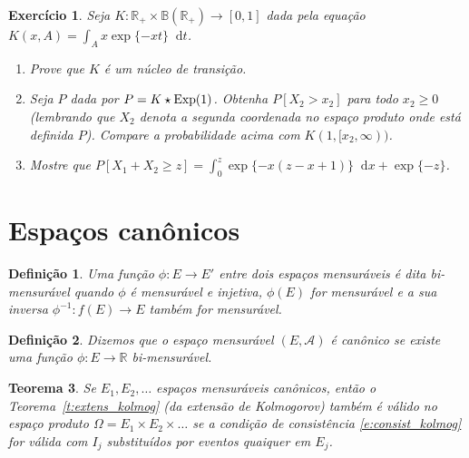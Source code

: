 \documentclass[reqno, draft]{book}
\newcommand*\1{\mathds{1}}
\newtheorem{theorem}{Teorema}[section]
\newtheorem{definition}[theorem]{Definição}
\newtheorem{exercise}[example]{Exercício}
\renewcommand*\d{\mathop{}\!\mathrm{d}}
\begin{document}
\begin{exercise}
  Seja $K:\mathbb{R}_+ \times \mathbb{B}(\mathbb{R}_+) \to [0,1]$ dada pela equação $K(x,A) = \int_A x \exp\{-x t\} \d t$.
  \begin{enumerate}[\quad a)]
  \item Prove que $K$ \'e um n\'ucleo de transi\c{c}\~ao.
  \item Seja $P$ dada por $P = K \star \textnormal{Exp}(1)$.
    Obtenha $P[X_2 > x_2]$ para todo $x_2 \geq 0$ (lembrando que $X_2$ denota a segunda coordenada no espa\c{c}o produto onde est\'a definida $P$).
    Compare a probabilidade acima com $K(1,[x_2, \infty))$.
  \item Mostre que $P[X_1 + X_2 \geq z] = \int_0^z \exp \{-x(z-x+1)\} \d x + \exp\{-z\}$.
  \end{enumerate}
\end{exercise}

\section{Espaços canônicos}

\begin{definition}
  Uma função $\phi:E \to E'$ entre dois espaços mensuráveis é dita bi-mensurável  quando $\phi$ é mensurável e injetiva, $\phi(E)$ for mensurável e a sua inversa $\phi^{-1}:f(E) \to E$ também for mensurável.
\end{definition}


\begin{definition}
  Dizemos que o espaço mensurável $(E, \mathcal{A})$ é canônico  se existe uma função $\phi: E \to \mathbb{R}$ bi-mensurável.
\end{definition}

\begin{theorem}
  Se $E_1, E_2, \dots$ espaços mensuráveis canônicos, então o Teorema~\ref{t:extens_kolmog} (da extensão de Kolmogorov) também é válido no espaço produto $\Omega = E_1 \times E_2 \times \dots$ se a condição de consistência \eqref{e:consist_kolmog} for válida com $I_j$ substituídos por eventos quaiquer em $E_j$.
\end{theorem}
\end{document}

